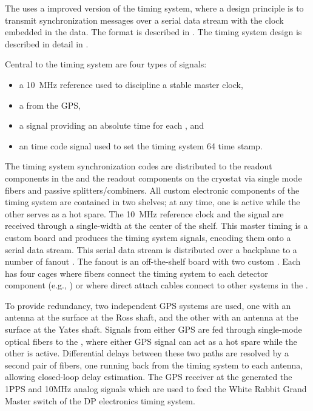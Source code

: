 The   uses a improved version of the  timing
system, where a design principle is to transmit synchronization messages over
a serial data stream with the clock embedded in the data. The format
is described in . The timing system design is
described in detail in .

Central to the timing system are four types of signals:
\begin{itemize}
\item a \SI{10}{\mega\hertz} reference used to discipline a stable master clock,
\item a  from the GPS,
\item a  signal providing an absolute time for each , and
\item an  time code signal
  used to set the timing system \SI{64}{\bit} time stamp.
\end{itemize}

The timing system synchronization codes are distributed to the  readout components in the  and the readout components on the cryostat via single mode fibers and passive splitters/combiners.
All custom electronic components of the timing system are contained in two  shelves; at any time, one is active while the other serves as a hot spare.
The \SI{10}{MHz} reference clock and the  signal are received through a single-width  at the center of the  shelf.
This master timing  is a custom board and produces the timing system signals, encoding them onto a serial data stream.
This serial data stream is distributed over a backplane to a number of fanout .
The fanout  is an off-the-shelf board with two custom .
Each  has four  cages where fibers connect the timing system to each detector component (e.g., ) or where direct attach cables connect to other systems in the .

To provide redundancy, two independent GPS systems are used,
one with an antenna at the surface at the Ross shaft, and the other
with an antenna at the surface at the Yates shaft. Signals from either
GPS are fed through single-mode optical fibers to the , where
either GPS signal can act as a hot spare while the other is active. 
Differential delays between these two paths are resolved by a second pair of
fibers, one running back from the timing system to each antenna, 
allowing closed-loop delay estimation.
%
The GPS receiver at the   generated the 1PPS and 10MHz analog signals which are used to feed
the White Rabbit Grand Master switch of the DP electronics timing system.



